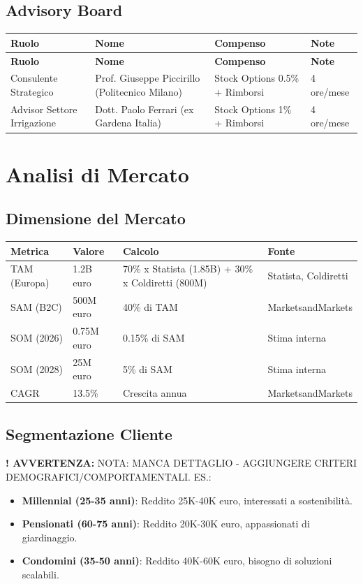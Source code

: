 \documentclass[11pt,a4paper]{report}
\newcommand{\warningtext}{\textbf{! AVVERTENZA: }}
\begin{document}
\section{Advisory Board}
\begin{longtable}{|L{2.5cm}|L{3.5cm}|L{2.5cm}|L{2cm}|}
\hline
{\bf Ruolo} & {\bf Nome} & {\bf Compenso} & {\bf Note} \\
\hline
\endfirsthead
\hline
{\bf Ruolo} & {\bf Nome} & {\bf Compenso} & {\bf Note} \\
\hline
\endhead
\endfoot
\endlastfoot
Consulente Strategico & Prof. Giuseppe Piccirillo (Politecnico Milano) & Stock Options 0.5\% + Rimborsi & 4 ore/mese \\
Advisor Settore Irrigazione & Dott. Paolo Ferrari (ex Gardena Italia) & Stock Options 1\% + Rimborsi & 4 ore/mese \\
\hline
\end{longtable}

\chapter{Analisi di Mercato}
\label{ch:market-analysis}

\section{Dimensione del Mercato}
\label{sec:market-size}
\begin{longtable}{|L{3cm}|C{2cm}|L{4.5cm}|L{4cm}|}
\hline
{\bf Metrica} & {\bf Valore} & {\bf Calcolo} & {\bf Fonte} \\ \hline
TAM (Europa) & 1.2B euro & 70\% x Statista (1.85B) + 30\% x Coldiretti (800M) & Statista, Coldiretti \\
SAM (B2C) & 500M euro & 40\% di TAM & MarketsandMarkets \\
SOM (2026) & 0.75M euro & 0.15\% di SAM & Stima interna \\
SOM (2028) & 25M euro & 5\% di SAM & Stima interna \\
CAGR & 13.5\% & Crescita annua & MarketsandMarkets \\ \hline
\end{longtable}

\section{Segmentazione Cliente}
\warningtext NOTA: MANCA DETTAGLIO - AGGIUNGERE CRITERI DEMOGRAFICI/COMPORTAMENTALI. ES.:
\begin{itemize}
\item {\bf Millennial (25-35 anni)}: Reddito 25K-40K euro, interessati a sostenibilità.
\item {\bf Pensionati (60-75 anni)}: Reddito 20K-30K euro, appassionati di giardinaggio.
\item {\bf Condomini (35-50 anni)}: Reddito 40K-60K euro, bisogno di soluzioni scalabili.
\end{itemize}
\end{document}
